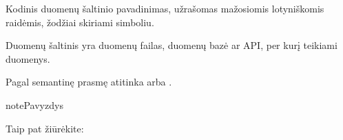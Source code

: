 \documentclass[letterpaper,10pt,lithuanian]{sphinxmanual}
\begin{document}
\begin{fulllineitems}
\label{\detokenize{formatas:resource}}
\pysigstartsignatures
\pysigline
{}
\pysigstopsignatures
\sphinxAtStartPar
{}

\sphinxAtStartPar
Kodinis duomenų šaltinio pavadinimas, užrašomas mažosiomis lotyniškomis
raidėmis, žodžiai skiriami \sphinxcode{\sphinxupquote{\_}} simboliu.

\sphinxAtStartPar
Duomenų šaltinis yra duomenų failas, duomenų bazė ar API, per kurį teikiami
duomenys.

\sphinxAtStartPar
Pagal semantinę prasmę atitinka  arba .

\begin{sphinxadmonition}{note}{Pavyzdys}

\begin{DUlineblock}{0em}
\item[] 
\item[] 
\end{DUlineblock}
\end{sphinxadmonition}


\begin{sphinxseealso}{Taip pat žiūrėkite:}

\begin{DUlineblock}{0em}
\item[] {\hyperref[\detokenize{dimensijos:resource}]{}}
\item[] {\hyperref[\detokenize{saltiniai:duomenu-saltiniai}]{}}
\end{DUlineblock}


\end{sphinxseealso}


\end{fulllineitems}

\end{document}
